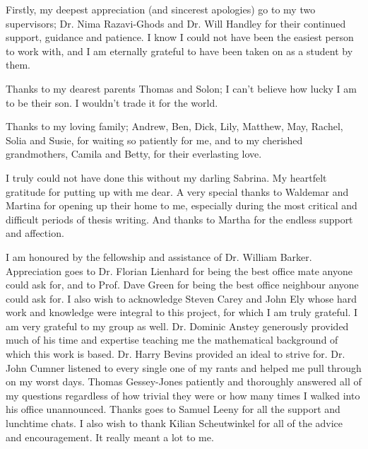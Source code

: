 
\begin{acknowledgements}      

Firstly, my deepest appreciation (and sincerest apologies) go to my two supervisors; Dr. Nima Razavi-Ghods and Dr. Will Handley for their continued support, guidance and patience. I know I could not have been the easiest person to work with, and I am eternally grateful to have been taken on as a student by them.

Thanks to my dearest parents Thomas and Solon; I can’t believe how lucky I am to be their son. I wouldn’t trade it for the world.

Thanks to my loving family; Andrew, Ben, Dick, Lily, Matthew, May, Rachel, Solia and Susie, for waiting so patiently for me, and to my cherished grandmothers, Camila and Betty, for their everlasting love.

I truly could not have done this without my darling Sabrina. My heartfelt gratitude for putting up with me dear. A very special thanks to Waldemar and Martina for opening up their home to me, especially during the most critical and difficult periods of thesis writing. And thanks to Martha for the endless support and affection.

I am honoured by the fellowship and assistance of Dr. William Barker. Appreciation goes to Dr. Florian Lienhard for being the best office mate anyone could ask for, and to Prof. Dave Green for being the best office neighbour anyone could ask for. I also wish to acknowledge Steven Carey and John Ely whose hard work and knowledge were integral to this project, for which I am truly grateful. I am very grateful to my group as well. Dr. Dominic Anstey generously provided much of his time and expertise teaching me the mathematical background of which this work is based. Dr. Harry Bevins provided an ideal to strive for. Dr. John Cumner listened to every single one of my rants and helped me pull through on my worst days. Thomas Gessey-Jones patiently and thoroughly answered all of my questions regardless of how trivial they were or how many times I walked into his office unannounced. Thanks goes to Samuel Leeny for all the support and lunchtime chats. I also wish to thank Kilian Scheutwinkel for all of the advice and encouragement. It really meant a lot to me.


\end{acknowledgements}
